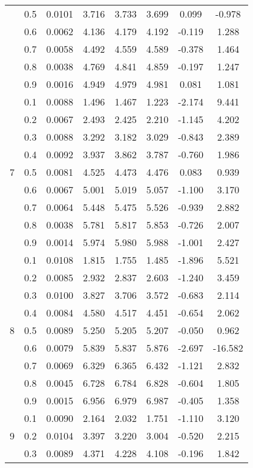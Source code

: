 \documentclass[11pt,a4paper]{report}
\begin{document}
\begin{longtable}{ | c | c || c | c | c | c | c | c | }
 & 0.5 & 0.0101 & 3.716 & 3.733 & 3.699 & 0.099 & -0.978 \\
 & 0.6 & 0.0062 & 4.136 & 4.179 & 4.192 & -0.119 & 1.288 \\
 & 0.7 & 0.0058 & 4.492 & 4.559 & 4.589 & -0.378 & 1.464 \\
 & 0.8 & 0.0038 & 4.769 & 4.841 & 4.859 & -0.197 & 1.247 \\
 & 0.9 & 0.0016 & 4.949 & 4.979 & 4.981 & 0.081 & 1.081 \\
 \hline
\multirow{9}{*}{7} & 0.1 & 0.0088 & 1.496 & 1.467 & 1.223 & -2.174 & 9.441 \\
 & 0.2 & 0.0067 & 2.493 & 2.425 & 2.210 & -1.145 & 4.202 \\
 & 0.3 & 0.0088 & 3.292 & 3.182 & 3.029 & -0.843 & 2.389 \\
 & 0.4 & 0.0092 & 3.937 & 3.862 & 3.787 & -0.760 & 1.986 \\
 & 0.5 & 0.0081 & 4.525 & 4.473 & 4.476 & 0.083 & 0.939 \\
 & 0.6 & 0.0067 & 5.001 & 5.019 & 5.057 & -1.100 & 3.170 \\
 & 0.7 & 0.0064 & 5.448 & 5.475 & 5.526 & -0.939 & 2.882 \\
 & 0.8 & 0.0038 & 5.781 & 5.817 & 5.853 & -0.726 & 2.007 \\
 & 0.9 & 0.0014 & 5.974 & 5.980 & 5.988 & -1.001 & 2.427 \\
 \hline
\multirow{9}{*}{8} & 0.1 & 0.0108 & 1.815 & 1.755 & 1.485 & -1.896 & 5.521 \\
 & 0.2 & 0.0085 & 2.932 & 2.837 & 2.603 & -1.240 & 3.459 \\
 & 0.3 & 0.0100 & 3.827 & 3.706 & 3.572 & -0.683 & 2.114 \\
 & 0.4 & 0.0084 & 4.580 & 4.517 & 4.451 & -0.654 & 2.062 \\
 & 0.5 & 0.0089 & 5.250 & 5.205 & 5.207 & -0.050 & 0.962 \\
 & 0.6 & 0.0079 & 5.839 & 5.837 & 5.876 & -2.697 & -16.582 \\
 & 0.7 & 0.0069 & 6.329 & 6.365 & 6.432 & -1.121 & 2.832 \\
 & 0.8 & 0.0045 & 6.728 & 6.784 & 6.828 & -0.604 & 1.805 \\
 & 0.9 & 0.0015 & 6.956 & 6.979 & 6.987 & -0.405 & 1.358 \\
 \hline
\multirow{9}{*}{9} & 0.1 & 0.0090 & 2.164 & 2.032 & 1.751 & -1.110 & 3.120 \\
 & 0.2 & 0.0104 & 3.397 & 3.220 & 3.004 & -0.520 & 2.215 \\
 & 0.3 & 0.0089 & 4.371 & 4.228 & 4.108 & -0.196 & 1.842 \\

\end{longtable}
\end{document}
